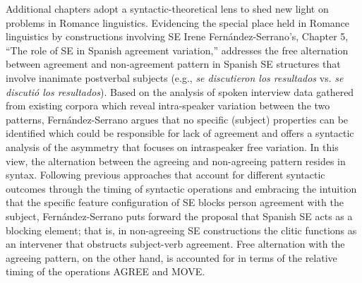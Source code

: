 \documentclass[output=paper,draftmode]{langscibook}
\begin{document}
Additional chapters adopt a syntactic-theoretical lens to shed new light on problems in Romance linguistics. Evidencing the special place held in Romance linguistics by constructions involving SE Irene Fernández-Serrano’s, Chapter 5, “The role of SE in Spanish agreement variation,” addresses the free alternation between agreement and non-agreement pattern in Spanish SE structures that involve inanimate postverbal subjects (e.g., \textit{se discutieron los resultados} vs. \textit{se discutió los resultados}). Based on the analysis of spoken interview data gathered from existing corpora which reveal intra-speaker variation between the two patterns, Fernández-Serrano argues that no specific (subject) properties can be identified which could be responsible for lack of agreement and offers a syntactic analysis of the asymmetry that focuses on intraspeaker free variation. In this view, the alternation between the agreeing and non-agreeing pattern resides in syntax. Following previous approaches that account for different syntactic outcomes through the timing of syntactic operations and embracing the intuition that the specific feature configuration of SE blocks person agreement with the subject, Fernández-Serrano puts forward the proposal that Spanish SE acts as a blocking element; that is, in non-agreeing SE constructions the clitic functions as an intervener that obstructs subject-verb agreement. Free alternation with the agreeing pattern, on the other hand, is accounted for in terms of the relative timing of the operations AGREE and MOVE.
\end{document}

